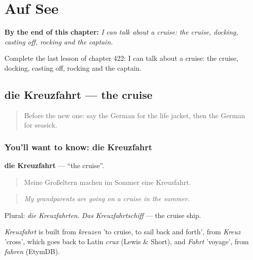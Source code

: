 
\chapter{Auf See}
\label{ch:ge-auf-see}

\begin{chapteropening}
\textbf{By the end of this chapter:} \emph{I can talk about a cruise: the cruise, docking, casting off, rocking and the captain.}

Complete the last lesson of chapter 422: I can talk about a cruise: the cruise, docking, casting off, rocking and the captain.
\end{chapteropening}

\section[die Kreuzfahrt]{die Kreuzfahrt — the cruise}

\label{lesson:GE-C422-kreuzfahrt}



\begin{quote}
Before the new one: say the German for the life jacket, then the German for seasick.
\end{quote}

\subsection*{You'll want to know: die Kreuzfahrt}
\textbf{die Kreuzfahrt} — \textquotedblleft{}the cruise\textquotedblright{}.

\begin{quote}
Meine Großeltern machen im Sommer eine Kreuzfahrt.
\end{quote}

\begin{quote}
\emph{My grandparents are going on a cruise in the summer.}
\end{quote}

Plural: \emph{die Kreuzfahrten}. \emph{Das Kreuzfahrtschiff} — the cruise ship.

\begin{cousinweb}
\emph{Kreuzfahrt} is built from \emph{kreuzen} 'to cruise, to sail back and forth', from \emph{Kreuz} 'cross', which goes back to Latin \emph{crux} (Lewis \& Short), and \emph{Fahrt} 'voyage', from \emph{fahren} (EtymDB).
\end{cousinweb}

